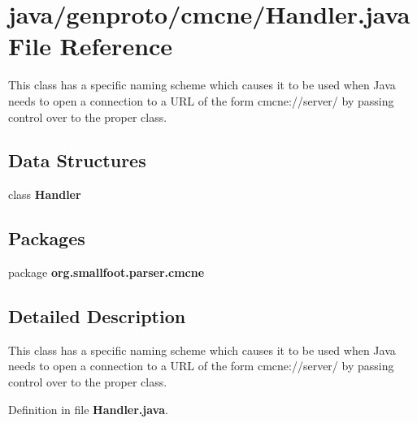 \section{java/genproto/cmcne/\+Handler.java File Reference}
\label{cmcne_2Handler_8java}


This class has a specific naming scheme which causes it to be used when Java needs to open a connection to a U\+R\+L of the form cmcne\+://server/ by passing control over to the proper class.  


\subsection*{Data Structures}
\begin{DoxyCompactItemize}
\item 
class {\bf Handler}
\end{DoxyCompactItemize}
\subsection*{Packages}
\begin{DoxyCompactItemize}
\item 
package {\bf org.\+smallfoot.\+parser.\+cmcne}
\end{DoxyCompactItemize}


\subsection{Detailed Description}
This class has a specific naming scheme which causes it to be used when Java needs to open a connection to a U\+R\+L of the form cmcne\+://server/ by passing control over to the proper class. 



Definition in file {\bf Handler.\+java}.


